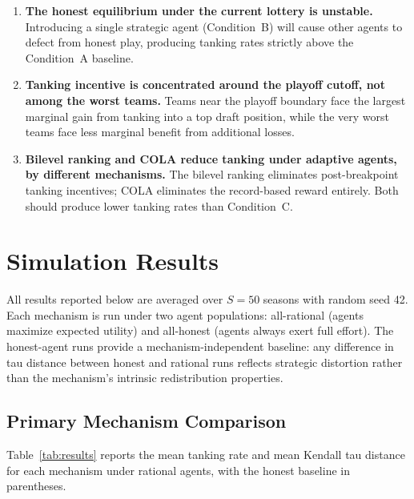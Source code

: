 \documentclass{article}
\begin{document}
\begin{enumerate}
    \item \textbf{The honest equilibrium under the current lottery is
    unstable.}
    Introducing a single strategic agent (Condition~B) will cause other agents
    to defect from honest play, producing tanking rates strictly above the
    Condition~A baseline.

    \item \textbf{Tanking incentive is concentrated around the playoff cutoff,
    not among the worst teams.}
    Teams near the playoff boundary face the largest marginal gain from tanking
    into a top draft position, while the very worst teams face less marginal
    benefit from additional losses.

    \item \textbf{Bilevel ranking and COLA reduce tanking under adaptive
    agents, by different mechanisms.}
    The bilevel ranking eliminates post-breakpoint tanking incentives;
    COLA eliminates the record-based reward entirely.
    Both should produce lower tanking rates than Condition~C.
\end{enumerate}


\section{Simulation Results}

All results reported below are averaged over $S = 50$ seasons with random
seed 42.
Each mechanism is run under two agent populations: all-rational (agents
maximize expected utility) and all-honest (agents always exert full effort).
The honest-agent runs provide a mechanism-independent baseline: any difference
in tau distance between honest and rational runs reflects strategic distortion
rather than the mechanism's intrinsic redistribution properties.

\subsection{Primary Mechanism Comparison}

Table~\ref{tab:results} reports the mean tanking rate and mean Kendall tau
distance for each mechanism under rational agents, with the honest baseline
in parentheses.
\end{document}
